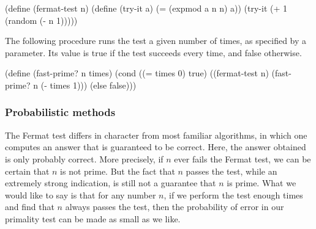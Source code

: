 \begin{schemedisplay}
(define (fermat-test n)
  (define (try-it a)
    (= (expmod a n n) a))
  (try-it (+ 1 (random (- n 1)))))
\end{schemedisplay}

The following procedure runs the test a given number of times, as
specified by a parameter.  Its value is true if the test succeeds
every time, and false otherwise.

\begin{schemedisplay}
(define (fast-prime? n times)
  (cond ((= times 0) true)
        ((fermat-test n) (fast-prime? n (- times 1)))
        (else false)))
\end{schemedisplay}

\subsubsection*{Probabilistic methods}

The Fermat test differs in character from most familiar algorithms, in
which one computes an answer that is guaranteed to be correct.  Here,
the answer obtained is only probably correct.  More precisely, if $n$
ever fails the Fermat test, we can be certain that $n$ is not prime.
But the fact that $n$ passes the test, while an extremely strong
indication, is still not a guarantee that $n$ is prime.  What we would
like to say is that for any number $n$, if we perform the test enough
times and find that $n$ always passes the test, then the probability
of error in our primality test can be made as small as we like.


